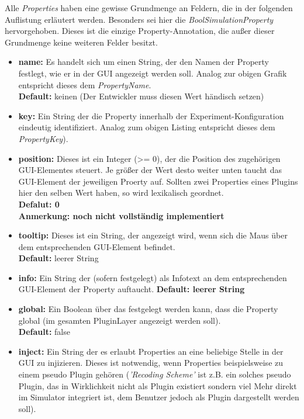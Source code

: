 \documentclass[a4paper, 11pt]{article} %
\begin{document}
Alle \emph{Properties} haben eine gewisse Grundmenge an Feldern, die in der folgenden Auflistung erläutert werden. Besonders sei hier die \emph{BoolSimulationProperty} hervorgehoben. Dieses ist die einzige Property-Annotation, die außer dieser Grundmenge keine weiteren Felder besitzt.
\begin{itemize}
	\item \textbf{name:} Es handelt sich um einen String, der den Namen der Property festlegt, wie er in der GUI angezeigt werden soll. Analog zur obigen Grafik entspricht dieses dem \emph{PropertyName}.\\
	\textbf{Default:} keinen (Der Entwickler muss diesen Wert händisch setzen)
	\item \textbf{key:} Ein String der die Property innerhalb der Experiment-Konfiguration eindeutig identifiziert. Analog zum obigen Listing entspricht dieses dem \emph{PropertyKey}).
	\item \textbf{position:} Dieses ist ein Integer (>= 0), der die Position des zugehörigen GUI-Elementes steuert. Je größer der Wert desto weiter unten taucht das GUI-Element der jeweiligen Proerty auf. Sollten zwei Properties eines Plugins hier den selben Wert haben, so wird lexikalisch geordnet.\\
	\textbf{Defalut: 0}\\
	\textbf{Anmerkung: noch nicht vollständig implementiert}
	\item \textbf{tooltip:} Dieses ist ein String, der angezeigt wird, wenn sich die Maus über dem entsprechenden GUI-Element befindet.\\
	\textbf{Default:} leerer String 
	\item \textbf{info:} Ein String der (sofern festgelegt) als Infotext an dem entsprechenden GUI-Element der Property auftaucht.  
	\textbf{Default: leerer String}
	\item \textbf{global:} Ein Boolean über das festgelegt werden kann, dass die Property global (im gesamten PluginLayer angezeigt werden soll).\\
	\textbf{Default:} false
	\item \textbf{inject:} Ein String der es erlaubt Properties an eine beliebige Stelle in der GUI zu injizieren. Dieses ist notwendig, wenn Properties beispielsweise zu einem pseudo Plugin gehören (\emph{'Recoding Scheme'} ist z.B. ein solches pseudo Plugin, das in Wirklichkeit nicht als Plugin existiert sondern viel Mehr direkt im Simulator integriert ist, dem Benutzer jedoch als Plugin dargestellt werden soll). \\

\end{itemize}
\end{document}
